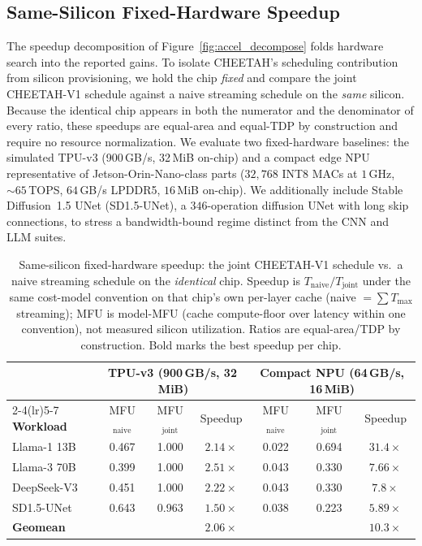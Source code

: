\subsection{Same-Silicon Fixed-Hardware Speedup}
\label{sec:fixed_hw}
The speedup decomposition of Figure~\ref{fig:accel_decompose} folds hardware search into the reported gains. To isolate CHEETAH's scheduling contribution from silicon provisioning, we hold the chip \emph{fixed} and compare the joint CHEETAH-V1 schedule against a naive streaming schedule on the \emph{same} silicon. Because the identical chip appears in both the numerator and the denominator of every ratio, these speedups are equal-area and equal-TDP by construction and require no resource normalization. We evaluate two fixed-hardware baselines: the simulated TPU-v3 (900\,GB/s, 32\,MiB on-chip) and a compact edge NPU representative of Jetson-Orin-Nano-class parts ($32{,}768$ INT8 MACs at $1$\,GHz, ${\sim}65$\,TOPS, $64$\,GB/s LPDDR5, $16$\,MiB on-chip). We additionally include Stable Diffusion~1.5 UNet (SD1.5-UNet), a $346$-operation diffusion UNet with long skip connections, to stress a bandwidth-bound regime distinct from the CNN and LLM suites.

\begin{table}[t]
\centering
\caption{Same-silicon fixed-hardware speedup: the joint CHEETAH-V1 schedule vs.\ a naive streaming schedule on the \emph{identical} chip. Speedup is $T_{\text{naive}}/T_{\text{joint}}$ under the same cost-model convention on that chip's own per-layer cache (naive $=\sum T_{\max}$ streaming); MFU is model-MFU (cache compute-floor over latency within one convention), not measured silicon utilization. Ratios are equal-area/TDP by construction. Bold marks the best speedup per chip.}
\label{tab:fixed_hw}
\scriptsize
\setlength{\tabcolsep}{4.5pt}
\renewcommand{\arraystretch}{1.22}
\begin{tabular}{@{}l ccc ccc@{}}
\toprule
 & \multicolumn{3}{c}{\cellcolor{bandtpu}\textbf{TPU-v3} (900\,GB/s, 32\,MiB)}
 & \multicolumn{3}{c}{\cellcolor{bandnpu}\textbf{Compact NPU} (64\,GB/s, 16\,MiB)} \\
\cmidrule(lr){2-4}\cmidrule(lr){5-7}
\textbf{Workload} & MFU$_{\text{naive}}$ & MFU$_{\text{joint}}$ & Speedup & MFU$_{\text{naive}}$ & MFU$_{\text{joint}}$ & Speedup \\
\midrule
Llama-1 13B     & 0.467 & 1.000 & $2.14\times$ & 0.022 & 0.694 & $\mathbf{31.4\times}$ \\
\rowcolor{rowalt}
Llama-3 70B     & 0.399 & 1.000 & $\mathbf{2.51\times}$ & 0.043 & 0.330 & $7.66\times$ \\
DeepSeek-V3     & 0.451 & 1.000 & $2.22\times$ & 0.043 & 0.330 & $7.8\times$ \\
\rowcolor{rowalt}
SD1.5-UNet      & 0.643 & 0.963 & $1.50\times$ & 0.038 & 0.223 & $5.89\times$ \\
\midrule
\rowcolor{rowgeo}
\textbf{Geomean} & & & $\mathbf{2.06\times}$ & & & $\mathbf{10.3\times}$ \\
\bottomrule
\end{tabular}
\end{table}


